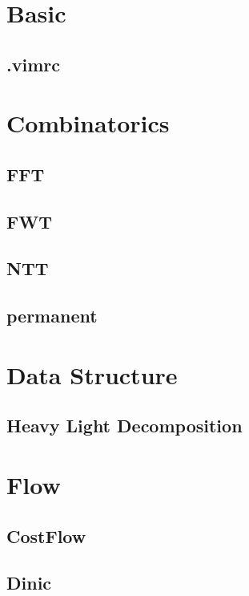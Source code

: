 \section{Basic}
\subsection{.vimrc}


\section{Combinatorics}
\subsection{FFT}

\subsection{FWT}

\subsection{NTT}

\subsection{permanent}


\section{Data Structure}
\subsection{Heavy Light Decomposition}


\section{Flow}
\subsection{CostFlow}

\subsection{Dinic}


